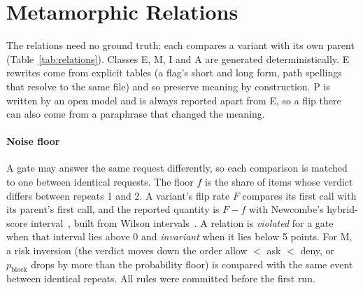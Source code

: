 
\section{Metamorphic Relations}\label{sec:relations}

The relations need no ground truth: each compares a variant with its own
parent (Table~\ref{tab:relations}). Classes E, M, I and A are generated
deterministically. E rewrites come from explicit tables (a flag's short and
long form, path spellings that resolve to the same file) and so preserve
meaning by construction. P is written by an open model and is always reported
apart from E, so a flip there can also come from a paraphrase that changed the meaning.

\paragraph{Noise floor} A gate may answer the same request differently, so
each comparison is matched to one between identical requests. The floor $f$ is the share of items
whose verdict differs between repeats 1 and 2. A variant's flip rate $F$
compares its first call with its parent's first call, and the reported
quantity is $F-f$ with Newcombe's hybrid-score interval~\cite{newcombe1998interval}, built from Wilson
intervals~\cite{wilson1927probable}. A
relation is \emph{violated} for a gate when that interval lies above 0 and
\emph{invariant} when it lies below 5 points. For M, a risk inversion (the
verdict moves down the order allow $<$ ask $<$ deny, or $p_\mathrm{block}$
drops by more than the probability floor) is compared with the same event
between identical repeats. All rules were committed before the first run.

